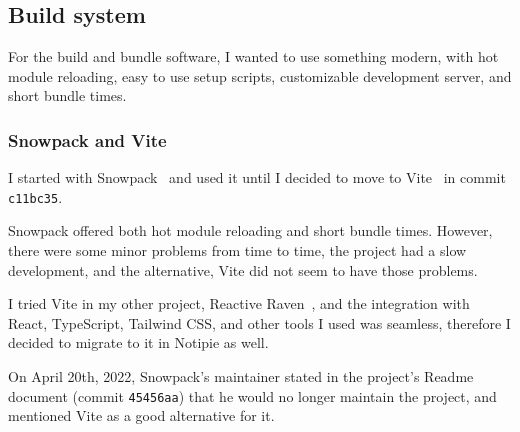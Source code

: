\subsection{Build system}\label{sec:build-system}

For the build and bundle software,
I wanted to use something modern,
with hot module reloading,
easy to use setup scripts,
customizable development server,
and short bundle times.

\subsubsection{Snowpack and Vite}\label{sec:snowpack-and-vite}

I started with Snowpack~\cite{schott_snowpack_2021}
and used it until I decided to move to Vite~\cite{you_vite_2022}
in commit \texttt{c11bc35}.

Snowpack offered both hot module reloading and short bundle times.
However, there were some minor problems from time to time,
the project had a slow development,
and the alternative,
Vite did not seem to have those problems.

I tried Vite in my other project,
Reactive Raven~\cite{sewera_reactive_2022},
and the integration with
React,
TypeScript,
Tailwind CSS,
and other tools I used was seamless,
therefore I decided to migrate to it in Notipie as well.

On April 20th, 2022,
Snowpack's maintainer stated in the project's Readme document
(commit \texttt{45456aa})
that he would no longer maintain the project,
and mentioned Vite as a good alternative for it.

